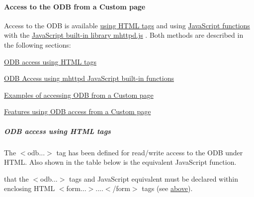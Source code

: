  \paragraph{Access to the ODB from a Custom page}\label{RC_mhttpd_custom_ODB_access}
\par




\par


Access to the ODB is available \hyperlink{RC_mhttpd_custom_ODB_access_RC_mhttpd_custom_odb_html}{using HTML tags} and using \hyperlink{RC_mhttpd_custom_ODB_access_RC_mhttpd_custom_odb_js}{JavaScript functions} with the \hyperlink{RC_mhttpd_custom_js_lib}{JavaScript built-\/in library mhttpd.js} . Both methods are described in the following sections:


\begin{DoxyItemize}
\item \hyperlink{RC_mhttpd_custom_ODB_access_RC_mhttpd_custom_odb_html}{ODB access using HTML tags}
\item \hyperlink{RC_mhttpd_custom_ODB_access_RC_mhttpd_custom_odb_js}{ODB Access using mhttpd JavaScript built-\/in functions}
\item \hyperlink{RC_mhttpd_custom_ODB_access_examples}{Examples of accessing ODB from a Custom page}
\item \hyperlink{RC_mhttpd_custom_ODB_access_features}{Features using ODB access from a Custom page}
\end{DoxyItemize}

\label{RC_mhttpd_custom_ODB_access_idx_odb-HTML-tag}
\hypertarget{RC_mhttpd_custom_ODB_access_idx_odb-HTML-tag}{}
 \hypertarget{RC_mhttpd_custom_ODB_access_RC_mhttpd_custom_odb_html}{}\subparagraph{ODB access using HTML tags}\label{RC_mhttpd_custom_ODB_access_RC_mhttpd_custom_odb_html}
The $<$odb...$>$ tag has been defined for read/write access to the ODB under HTML. Also shown in the table below is the equivalent JavaScript function.

that the $<$odb...$>$ tags and JavaScript equivalent must be declared within enclosing HTML $<$form...$>$....$<$/form$>$  tags (see \hyperlink{RC_mhttpd_custom_features_RC_mhttpd_custom_key_access}{above}).

